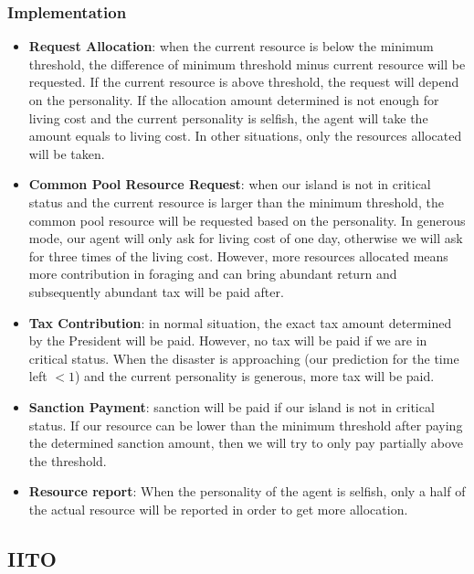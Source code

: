 \subsubsection{Implementation} \label{subsubsec:Team6_IIGO:Implementation}
\begin{itemize}
\item \textbf{Request Allocation}: when the current resource is below the minimum threshold, the difference of minimum threshold minus current resource will be requested. If the current resource is above threshold, the request will depend on the personality. If the allocation amount determined is not enough for living cost and the current personality is selfish, the agent will take the amount equals to living cost. In other situations, only the resources allocated will be taken.
\item \textbf{Common Pool Resource Request}: when our island is not in critical status and the current resource is larger than the minimum threshold, the common pool resource will be requested based on the personality. In generous mode, our agent will only ask for living cost of one day, otherwise we will ask for three times of the living cost. However, more resources allocated means more contribution in foraging and can bring abundant return and subsequently abundant tax will be paid after.
\item \textbf{Tax Contribution}: in normal situation, the exact tax amount determined by the President will be paid. However, no tax will be paid if we are in critical status. When the disaster is approaching (our prediction for the time left $< 1$) and the current personality is generous, more tax will be paid. 
\item \textbf {Sanction Payment}: sanction will be paid if our island is not in critical status. If our resource can be lower than the minimum threshold after paying the determined sanction amount, then we will try to only pay partially above the threshold. 
\item \textbf {Resource report}: When the personality of the agent is selfish, only a half of the actual resource will be reported in order to get more allocation.
\end{itemize}

\subsection{IITO} \label{subsec:Team6_IITO}
